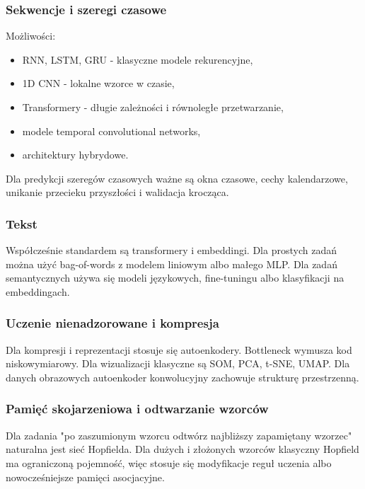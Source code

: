 \subsubsection{Sekwencje i szeregi czasowe}

Możliwości:
\begin{itemize}
  \item RNN, LSTM, GRU - klasyczne modele rekurencyjne,
  \item 1D CNN - lokalne wzorce w czasie,
  \item Transformery - długie zależności i równoległe przetwarzanie,
  \item modele temporal convolutional networks,
  \item architektury hybrydowe.
\end{itemize}

Dla predykcji szeregów czasowych ważne są okna czasowe, cechy kalendarzowe, unikanie przecieku przyszłości i walidacja krocząca.

\subsubsection{Tekst}

Współcześnie standardem są transformery i embeddingi. Dla prostych zadań można użyć bag-of-words z modelem liniowym albo małego MLP. Dla zadań semantycznych używa się modeli językowych, fine-tuningu albo klasyfikacji na embeddingach.

\subsubsection{Uczenie nienadzorowane i kompresja}

Dla kompresji i reprezentacji stosuje się autoenkodery. Bottleneck wymusza kod niskowymiarowy. Dla wizualizacji klasyczne są SOM, PCA, t-SNE, UMAP. Dla danych obrazowych autoenkoder konwolucyjny zachowuje strukturę przestrzenną.

\subsubsection{Pamięć skojarzeniowa i odtwarzanie wzorców}

Dla zadania "po zaszumionym wzorcu odtwórz najbliższy zapamiętany wzorzec" naturalna jest sieć Hopfielda. Dla dużych i złożonych wzorców klasyczny Hopfield ma ograniczoną pojemność, więc stosuje się modyfikacje reguł uczenia albo nowocześniejsze pamięci asocjacyjne.


